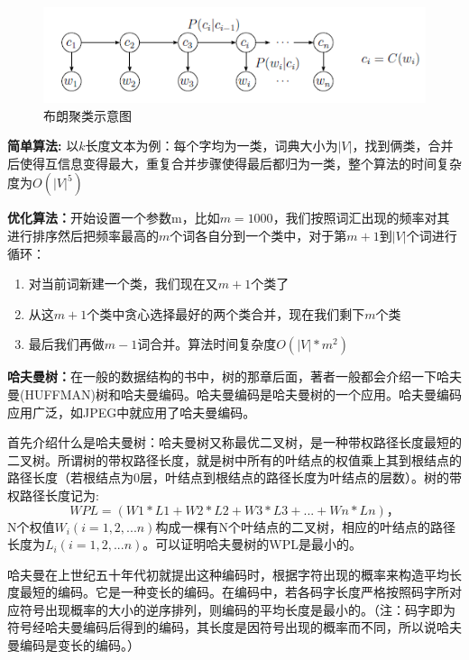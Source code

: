 \documentclass[12pt,a4paper]{article}
\begin{document}
\begin{figure}
  \centering
  \includegraphics[width=0.9\linewidth]{./figures/brown_clustering.png}
  \caption{布朗聚类示意图}\label{fig:brown}
\end{figure}

\textbf{简单算法:} 以$k$长度文本为例：每个字均为一类，词典大小为$|V|$，找到俩类，合并后使得互信息变得最大，重复合并步骤使得最后都归为一类，整个算法的时间复杂度为$O(|V|^{5})$

\textbf{优化算法：}开始设置一个参数m，比如$m=1000$，我们按照词汇出现的频率对其进行排序然后把频率最高的$m$个词各自分到一个类中，对于第$m+1$到$|V|$个词进行循环：
\begin{enumerate}
  \item 对当前词新建一个类，我们现在又$m+1$个类了
  \item 从这$m+1$个类中贪心选择最好的两个类合并，现在我们剩下$m$个类
  \item 最后我们再做$m-1$词合并。算法时间复杂度$O(|V|*m^2)$
\end{enumerate}


\textbf{哈夫曼树：}在一般的数据结构的书中，树的那章后面，著者一般都会介绍一下哈夫曼(HUFFMAN)树和哈夫曼编码。哈夫曼编码是哈夫曼树的一个应用。哈夫曼编码应用广泛，如JPEG中就应用了哈夫曼编码。

首先介绍什么是哈夫曼树：哈夫曼树又称最优二叉树，是一种带权路径长度最短的二叉树。所谓树的带权路径长度，就是树中所有的叶结点的权值乘上其到根结点的路径长度（若根结点为0层，叶结点到根结点的路径长度为叶结点的层数）。树的带权路径长度记为:
\begin{equation}
WPL=(W1*L1+W2*L2+W3*L3+...+Wn*Ln)，
\end{equation}
N个权值$W_i(i=1,2,...n)$构成一棵有N个叶结点的二叉树，相应的叶结点的路径长度为$L_i(i=1,2,...n)$。可以证明哈夫曼树的WPL是最小的。

哈夫曼在上世纪五十年代初就提出这种编码时，根据字符出现的概率来构造平均长度最短的编码。它是一种变长的编码。在编码中，若各码字长度严格按照码字所对应符号出现概率的大小的逆序排列，则编码的平均长度是最小的。（注：码字即为符号经哈夫曼编码后得到的编码，其长度是因符号出现的概率而不同，所以说哈夫曼编码是变长的编码。）
\end{document}
